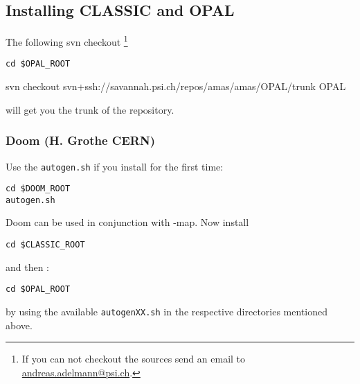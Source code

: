 



\subsection{Installing CLASSIC and OPAL} \label{sec:instmacclop}
The following svn checkout \footnote{If you can not checkout the sources
send an email to \url{andreas.adelmann@psi.ch}.}
\begin{footnotesize}
\begin{verbatim}cd $OPAL_ROOT
\end{verbatim}
\end{footnotesize}
\begin{center}
svn checkout svn+ssh://savannah.psi.ch/repos/amas/amas/OPAL/trunk OPAL
\end{center}
will get you the trunk of the repository. 

\subsubsection{Doom (H. Grothe CERN) }
Use the {\tt autogen.sh} if you install for the first time:
\begin{verbatim}
cd $DOOM_ROOT
autogen.sh
\end{verbatim}
Doom can be used in conjunction with \opal-map. Now  install \classic\:
\begin{footnotesize}
\begin{verbatim}
cd $CLASSIC_ROOT
\end{verbatim}
\end{footnotesize}
and then \opal :
\begin{footnotesize}
\begin{verbatim}
cd $OPAL_ROOT
\end{verbatim}
\end{footnotesize}
by using the available {\tt autogenXX.sh} in the respective directories mentioned above.

